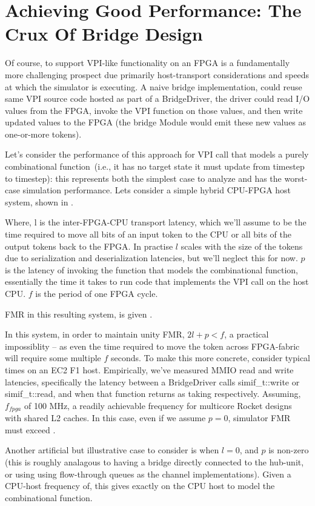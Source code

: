 \section{Achieving Good Performance: The Crux Of Bridge Design}
Of course, to support VPI-like functionality on an FPGA is a fundamentally more
challenging prospect due primarily host-transport considerations and speeds at
which the simulator is executing. A naive bridge implementation, could reuse
same VPI source code hosted as part of a BridgeDriver, the driver could read
I/O values from the FPGA, invoke the VPI function on those values, and then
write updated values to the FPGA (the bridge Module would emit these new values
as one-or-more tokens).

Let's consider the performance of this approach for VPI call that models a
purely combinational function~(i.e., it has no target state it must update from
timestep to timestep): this represents both the simplest case to analyze and
has the worst-case simulation performance. Lets consider a simple hybrid
CPU-FPGA host system, shown in .

Where, l is the inter-FPGA-CPU transport latency, which we'll assume to be the
time required to move all bits of an input token to the CPU or all bits of the
output tokens back to the FPGA. In practise $l$ scales with the size of the
tokens due to serialization and deserialization latencies, but we'll neglect
this for now.
$p$ is the latency of invoking the function that models the
combinational function, essentially the time it takes to run code that
implements the VPI call on the host CPU.
$f$ is the period of one FPGA cycle.

FMR in this resulting system, is given .

In this system, in order to maintain unity FMR, $2l + p < f$, a practical
impossiblity -- as even the time required to move the token across FPGA-fabric
will require some multiple $f$ seconds. To make this more concrete, consider
typical times on an EC2 F1 host. Empirically, we've measured MMIO read and
write latencies, specifically the latency between a BridgeDriver calls
simif\_t::write or simif\_t::read, and when that function returns as taking
  respectively. Assuming, $f_{fpga}$ of 100 MHz, a
readily achievable frequency for multicore Rocket designs with shared L2
caches. In this case, even if we assume $p = 0$, simulator FMR must exceed
.

Another artificial but illustrative case to consider is when $l = 0$, and $p$
is non-zero (this is roughly analagous to having a bridge directly connected to
the hub-unit, or using using flow-through queues as the channel implementations). Given a CPU-host frequency
of, this gives exactly  on the CPU host to model the combinational
function.

